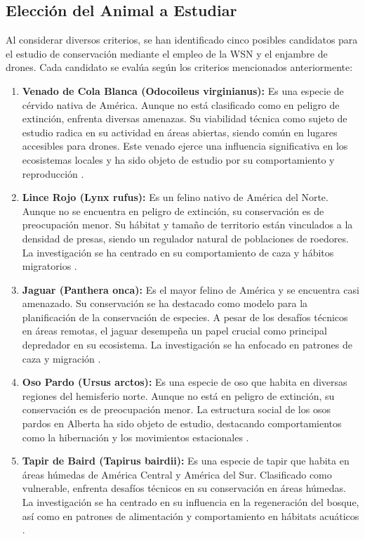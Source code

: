 \subsection{Elección del Animal a Estudiar}

Al considerar diversos criterios, se han identificado cinco posibles candidatos para el estudio de conservación mediante el empleo de la WSN y el enjambre de drones. Cada candidato se evalúa según los criterios mencionados anteriormente:

\begin{enumerate}
\item \textbf{Venado de Cola Blanca (Odocoileus virginianus):} Es una especie de cérvido nativa de América. Aunque no está clasificado como en peligro de extinción, enfrenta diversas amenazas. Su viabilidad técnica como sujeto de estudio radica en su actividad en áreas abiertas, siendo común en lugares accesibles para drones. Este venado ejerce una influencia significativa en los ecosistemas locales y ha sido objeto de estudio por su comportamiento y reproducción \cite{123}.
\item\textbf{ Lince Rojo (Lynx rufus):} Es un felino nativo de América del Norte. Aunque no se encuentra en peligro de extinción, su conservación es de preocupación menor. Su hábitat y tamaño de territorio están vinculados a la densidad de presas, siendo un regulador natural de poblaciones de roedores. La investigación se ha centrado en su comportamiento de caza y hábitos migratorios \cite{124}.
\item \textbf{Jaguar (Panthera onca):} Es el mayor felino de América y se encuentra casi amenazado. Su conservación se ha destacado como modelo para la planificación de la conservación de especies. A pesar de los desafíos técnicos en áreas remotas, el jaguar desempeña un papel crucial como principal depredador en su ecosistema. La investigación se ha enfocado en patrones de caza y migración \cite{125}.
\item \textbf{Oso Pardo (Ursus arctos):} Es una especie de oso que habita en diversas regiones del hemisferio norte. Aunque no está en peligro de extinción, su conservación es de preocupación menor. La estructura social de los osos pardos en Alberta ha sido objeto de estudio, destacando comportamientos como la hibernación y los movimientos estacionales \cite{126}.
\item \textbf{Tapir de Baird (Tapirus bairdii):} Es una especie de tapir que habita en áreas húmedas de América Central y América del Sur. Clasificado como vulnerable, enfrenta desafíos técnicos en su conservación en áreas húmedas. La investigación se ha centrado en su influencia en la regeneración del bosque, así como en patrones de alimentación y comportamiento en hábitats acuáticos \cite{127}.

\end{enumerate}

